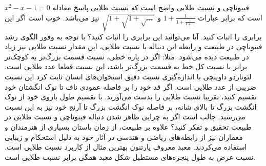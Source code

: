 \begin{EXTRA}{فیبوناچی و نسبت طلایی }
    \p
    واضح است که نسبت طلایی پاسخ معادله
    $x^2-x-1=0$
    است که برابر عبارات
    $1+\frac{1}{1+\frac{1}{1+...}}$
    و
    $\sqrt{1+\sqrt{1+\sqrt{...}}}$
    نیز می‌باشد.
    خوب است اگر این برابری را اثبات کنید. آیا می‌توانید این برابری را اثبات کنید؟
    \p
    با توجه به وفور الگوی رشد فیبوناچی در طبیعت و رابطه این دنباله با نسبت طلایی، این مقدار نسبت طلایی نیز زیاد در طبیعت دیده می‌شود.
    مثلا:
    اگر در پاره خطی، نسبت قسمت بزرگ‌تر به کوچک‌تر برابر با نسبت کل خط به قسمت بزرگ‌تر باشد، این نسبت قطعا عدد طلایی است.
    لئوناردو داوینچی با اندازه‌گیری نسبت دقیق استخوان‌های انسان ثابت کرد این نسبت ضریبی از عدد طلایی است.
    اگر قد خود را بر فاصله عمودی ناف تا نوک انگشتان خود تقسیم کنید، تقریبا نسبت طلایی را بدست می‌آورید.
    با تقسیم طول بازوی خود از نوک انگشت بزرگ تا بالای شانه، بر فاصله نوک انگشت بزرگ تا آرنج خود نیز به این نسبت می‌رسید.
    جالب است اگر به چرایی ظاهر شدن دنباله فیبوناچی و نسبت طلایی در طبیعت تحقیق و تفکر کنید؟
    \p
    علاوه بر طبیعت، از زمان باستان بسیاری از هنرمندان و معماران نیز از رابطه‌های ریاضی و هندسی در آثار خود به دلیل استحکام و زیبایی استفاده می‌کردند.
    معبد معروف پارتنون بهترین مثال از کاربرد نسبت طلایی است. نسبت عرض به طول پنجره‌های مستطیل شکل معبد همگی برابر نسبت طلایی است.

\end{EXTRA}